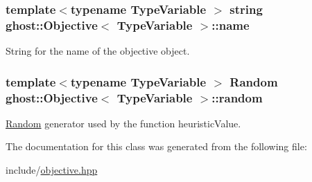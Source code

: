 \subsubsection[{\texorpdfstring{name}{name}}]{\setlength{\rightskip}{0pt plus 5cm}template$<$typename Type\+Variable $>$ string {\bf ghost\+::\+Objective}$<$ Type\+Variable $>$\+::name\hspace{0.3cm}{\ttfamily [protected]}}\hypertarget{classghost_1_1Objective_a02aee324f6958b6c533f27ec430690fe}{}\label{classghost_1_1Objective_a02aee324f6958b6c533f27ec430690fe}


String for the name of the objective object. 

\subsubsection[{\texorpdfstring{random}{random}}]{\setlength{\rightskip}{0pt plus 5cm}template$<$typename Type\+Variable $>$ {\bf Random} {\bf ghost\+::\+Objective}$<$ Type\+Variable $>$\+::random\hspace{0.3cm}{\ttfamily [protected]}}\hypertarget{classghost_1_1Objective_ae4b72b2e592243707f478ec1adbef234}{}\label{classghost_1_1Objective_ae4b72b2e592243707f478ec1adbef234}


\hyperlink{classghost_1_1Random}{Random} generator used by the function heuristic\+Value. 



The documentation for this class was generated from the following file\+:\begin{DoxyCompactItemize}
\item 
include/\hyperlink{objective_8hpp}{objective.\+hpp}\end{DoxyCompactItemize}
